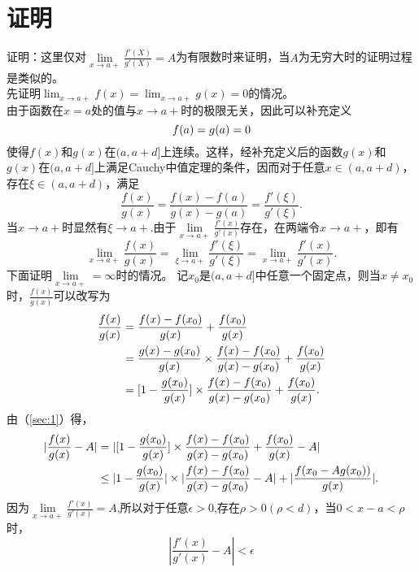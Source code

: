 \documentclass{ctexart}
\begin{document}
\section{证明}
证明：这里仅对$\lim\limits_{x \to a+}\frac{f'(X)}{g'(X)}=A$为有限数时来证明，当$A$为无穷大时的证明过程是类似的。\\
       先证明$\lim_{x \to a+}f(x)=\lim_{x \to a+}g(x)=0$的情况。\\
      由于函数在$x=a$处的值与$x \to a+$时的极限无关，因此可以补充定义
   \begin{equation}
   f(a)=g(a)=0\notag
   \end{equation}
      使得$f(x)$和$g(x)$在$(a,a+d]$上连续。这样，经补充定义后的函数$g(x)$和$g(x)$在$(a,a+d]$上满足Cauchy中值定理的条件，因而对于任意$x \in (a,a+d)$，存在$\xi \in (a,a+d)$，满足
    \begin{equation}
    \frac{f(x)}{g(x)}=\frac{f(x)-f(a)}{g(x)-g(a)}=\frac{f'(\xi)}{g'(\xi)}.
    \end{equation}
        当$x \to a+$时显然有$\xi \to a+$.由于$\lim\limits_{x \to a+}\frac{f'(x)}{g'(x)}$存在，在两端令$x \to a+$，即有
    \begin{equation}
    \lim_{x \to a+}\frac{f(x)}{g(x)}=\lim_{\xi \to a+}\frac{f'(\xi)}{g'(\xi)}=\lim_{x \to a+}\frac{f'(x)}{g'(x)}.
    \end{equation}
        下面证明$\lim\limits_{x \to a+}=\infty$时的情况。
        记$x_{0}$是$(a,a+d]$中任意一个固定点，则当$x  \neq x_{0}$时，$\frac{f(x)}{g(x)}$可以改写为
     \begin{align}
     \frac{f(x)}{g(x)}&=\frac{f(x)-f(x_{0})}{g(x)}+\frac{f(x_{0})}{g(x)}\notag\\
     &=\frac{g(x)-g(x_{0})}{g(x)}\times\frac{f(x)-f(x_{0})}{g(x)-g(x_{0})}+\frac{f(x_{0})}{g(x)}\notag\\
     &=[1-\frac{g(x_{0})}{g(x)}]\times\frac{f(x)-f(x_{0})}{g(x)-g(x_{0})}+\frac{f(x_{0})}{g(x)}.\label{sec:1}
     \end{align}
         由（\ref{sec:1}）得，
     \begin{align}
     |\frac{f(x)}{g(x)}-A|&=|[1-\frac{g(x_{0})}{g(x)}]\times\frac{f(x)-f(x_{0})}{g(x)-g(x_{0})}+\frac{f(x_{0})}{g(x)}-A|\notag\\
     &\le|1-\frac{g(x_{0})}{g(x)}|\times|\frac{f(x)-f(x_{0})}{g(x)-g(x_{0})}-A|+|\frac{f(x_{0}-Ag(x_{0}))}{g(x)}|.
     \end{align}
          因为$\lim\limits_{x \to a+}\frac{f'(x)}{g'(x)}=A$,所以对于任意$\epsilon>0$,存在$\rho>0(\rho<d)$，当$0<x-a<\rho$时，
          \begin{equation}
          |\frac{f'(x)}{g'(x)}-A|<\epsilon
          \end{equation}
\end{document}
